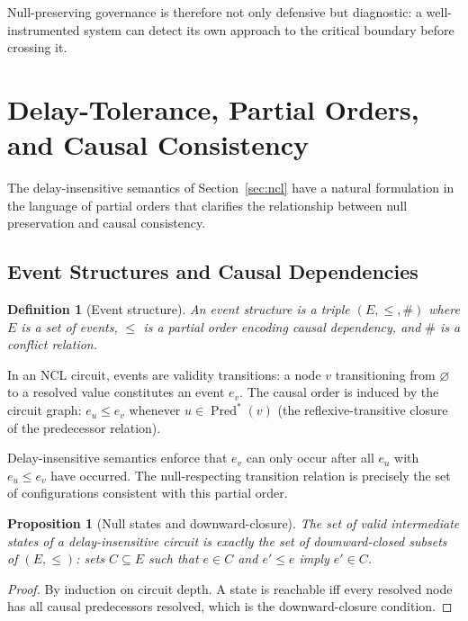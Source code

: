 \documentclass[11pt]{article}
\newtheorem{definition}{Definition}
\newtheorem{proposition}{Proposition}
\theoremstyle{remark}
\begin{document}
Null-preserving governance is therefore not only defensive but diagnostic: a well-instrumented system can detect its own approach to the critical boundary before crossing it.

\section{Delay-Tolerance, Partial Orders, and Causal Consistency}
\label{sec:causal}

The delay-insensitive semantics of Section~\ref{sec:ncl} have a natural formulation in the language of partial orders that clarifies the relationship between null preservation and causal consistency.

\subsection{Event Structures and Causal Dependencies}

\begin{definition}[Event structure]
An event structure is a triple $(E, \leq, \#)$ where $E$ is a set of events, $\leq$ is a partial order encoding causal dependency, and $\#$ is a conflict relation.
\end{definition}

In an NCL circuit, events are validity transitions: a node $v$ transitioning from $\varnothing$ to a resolved value constitutes an event $e_v$. The causal order is induced by the circuit graph: $e_u \leq e_v$ whenever $u \in \operatorname{Pred}^*(v)$ (the reflexive-transitive closure of the predecessor relation).

Delay-insensitive semantics enforce that $e_v$ can only occur after all $e_u$ with $e_u \leq e_v$ have occurred. The null-respecting transition relation is precisely the set of configurations consistent with this partial order.

\begin{proposition}[Null states and downward-closure]
The set of valid intermediate states of a delay-insensitive circuit is exactly the set of downward-closed subsets of $(E, \leq)$: sets $C \subseteq E$ such that $e \in C$ and $e' \leq e$ imply $e' \in C$.
\end{proposition}

\begin{proof}
By induction on circuit depth. A state is reachable iff every resolved node has all causal predecessors resolved, which is the downward-closure condition.
\end{proof}
\end{document}

